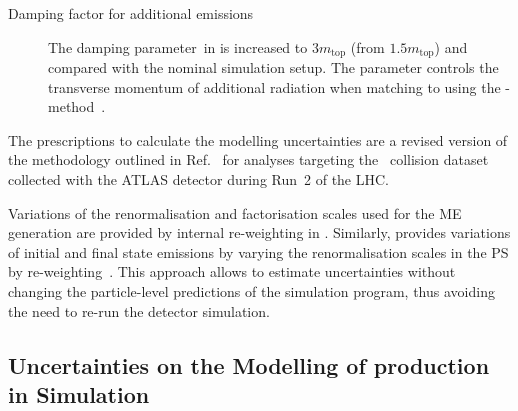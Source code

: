 \begin{description}
\item[Damping factor for additional emissions] The damping parameter~\hdamp in
  \POWHEGBOX[v2] is increased to $3 m_\text{top}$ (from $1.5 m_\text{top}$) and
  compared with the nominal simulation setup. The \hdamp parameter controls the
  transverse momentum of additional radiation when matching \POWHEGBOX[v2] to
  \PYTHIA[8] using the
  \POWHEG-method~\cite{ATL-PHYS-PUB-2016-020,ATL-PHYS-PUB-2020-023}.

\end{description}
The prescriptions to calculate the \ttbar modelling uncertainties are a revised
version of the methodology outlined in Ref.~\cite{ATL-PHYS-PUB-2020-023} for
analyses targeting the \pp~collision dataset collected with the ATLAS detector
during Run~2 of the LHC.


Variations of the renormalisation and factorisation scales used for the ME
generation are provided by internal re-weighting in \POWHEGBOX[v2]. Similarly,
\PYTHIA[8] provides variations of initial and final state emissions by varying
the renormalisation scales in the PS by
re-weighting~\cite{Mrenna:2016sih,pythia-variations-online}. This approach
allows to estimate uncertainties without changing the particle-level predictions
of the simulation program, thus avoiding the need to re-run the detector
simulation.



\subsection{Uncertainties on the Modelling of \Zjets production in Simulation}%
\label{app:zjets_uncertainties}

